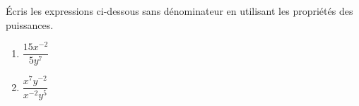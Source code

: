 %
%
    Écris les expressions ci-dessous sans dénominateur en utilisant les propriétés des puissances.
    \begin{enumerate}[cols=2]
        \item $\dfrac{15x^{-2}}{5y^7}$
        \item $\dfrac{x^7 y^{-2}}{x^{-2}y^5}$
    \end{enumerate}
